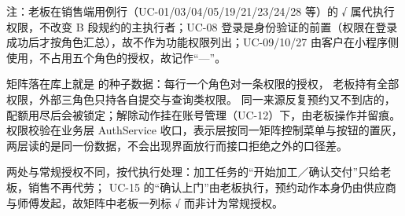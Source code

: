 注：老板在销售端用例行（UC-01/03/04/05/19/21/23/24/28 等）的 √ 属代执行权限，不改变 B 段规约的主执行者；UC-08 登录是身份验证的前置（权限在登录成功后才按角色汇总），故不作为功能权限列出；UC-09/10/27 由客户在小程序侧使用，不占用五个角色的授权，故记作“—”。

矩阵落在库上就是  的种子数据：每行一个角色对一条权限的授权，
老板持有全部权限，外部三角色只持各自提交与查询类权限。
同一来源反复预约又不到店的，配额用尽后会被锁定；解除动作挂在账号管理（UC-12）下，由老板操作并留痕。
权限校验在业务层 AuthService 收口，表示层按同一矩阵控制菜单与按钮的置灰，
两层读的是同一份数据，不会出现界面放行而接口拒绝之外的口径差。

两处与常规授权不同，按代执行处理：加工任务的“开始加工／确认交付”只给老板，销售不再代劳；
UC-15 的“确认上门”由老板执行，预约动作本身仍由供应商与师傅发起，故矩阵中老板一列标 √ 而非计为常规授权。

